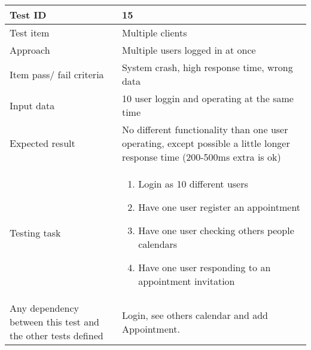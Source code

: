 \documentclass[a4paper, 10pt]{article}
\begin{document}
\begin{tabularx}{\textwidth}{ |X|X| }
\hline
\rowcolor{Gray}
Test ID & 15 \\ \hline
Test item & Multiple clients \\ \hline
Approach & Multiple users logged in at once\\ \hline
Item pass/ fail criteria & System crash, high response time, wrong data \\ \hline
Input data & 10 user loggin and operating at the same time\\ \hline
Expected result &
 No different functionality than one user operating, except possible a little longer response time (200-500ms extra is ok)\\ \hline
Testing task &
\begin{enumerate}
    \item Login as 10 different users
    \item Have one user register an appointment
    \item Have one user checking others people calendars
    \item Have one user responding to an appointment invitation
\end{enumerate}\\ \hline
    
Any dependency between this test and the other tests defined & Login, see others calendar and add Appointment. \\ \hline

\end{tabularx}
\end{document}
